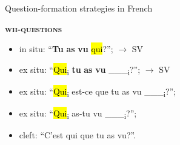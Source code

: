 \documentclass[lesson_slides]{subfiles}
\begin{document}
\begin{frame}[c]{Question-formation strategies in French}

    \noindent \textbf{\textsc{wh-questions}}
    \begin{itemize}
        \item[\ding{227}] in situ: “\textbf{Tu} \textbf{as} \textbf{vu} \hl{qui}?”; $\longrightarrow$ SV
        \item[\ding{227}] ex situ: “\hl{Qui}\textsubscript{i} \textbf{tu} \textbf{as} \textbf{vu} \_\_\_\textsubscript{i}?”;  $\longrightarrow$ SV
        \item[\ding{227}] ex situ: “\hl{Qui}\textsubscript{i} est-ce que tu as vu \_\_\_\textsubscript{i}?”; 
        \item[\ding{227}] ex situ: “\hl{Qui}\textsubscript{i} as-tu vu \_\_\_\textsubscript{i}?”;
        \item[\ding{227}] cleft: “C’est qui que tu as vu?”.
    \end{itemize}
   
\end{frame}

\end{document}
